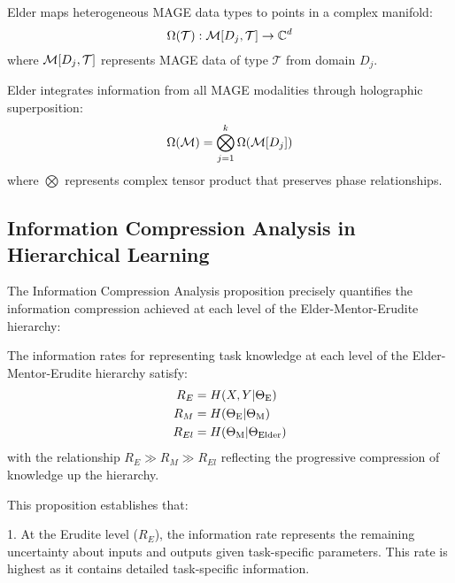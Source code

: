 \begin{proposition}
Elder maps heterogeneous MAGE data types to points in a complex manifold:
\begin{equation}
\Omega(\mathcal{T}): \mathcal{M}[D_j, \mathcal{T}] \rightarrow \mathbb{C}^{d}
\end{equation}
where $\mathcal{M}[D_j, \mathcal{T}]$ represents MAGE data of type $\mathcal{T}$ from domain $D_j$.
\end{proposition}

\begin{theorem}
Elder integrates information from all MAGE modalities through holographic superposition:
\begin{equation}
\Omega(\mathcal{M}) = \bigotimes_{j=1}^k \Omega(\mathcal{M}[D_j])
\end{equation}
where $\bigotimes$ represents complex tensor product that preserves phase relationships.
\end{theorem}

\subsection{Information Compression Analysis in Hierarchical Learning}

The Information Compression Analysis proposition precisely quantifies the information compression achieved at each level of the Elder-Mentor-Erudite hierarchy:

\begin{proposition}
The information rates for representing task knowledge at each level of the Elder-Mentor-Erudite hierarchy satisfy:
\begin{align}
R_E &= H(X, Y | \Theta_{\text{E}}) \\
R_M &= H(\Theta_{\text{E}} | \Theta_{\text{M}}) \\
R_{El} &= H(\Theta_{\text{M}} | \Theta_{\text{Elder}})
\end{align}
with the relationship $R_E \gg R_M \gg R_{El}$ reflecting the progressive compression of knowledge up the hierarchy.
\end{proposition}

This proposition establishes that:

1. At the Erudite level ($R_E$), the information rate represents the remaining uncertainty about inputs and outputs given task-specific parameters. This rate is highest as it contains detailed task-specific information.


